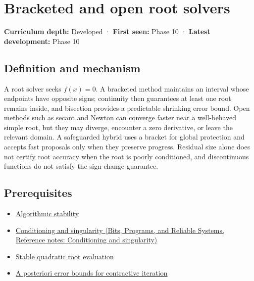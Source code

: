 \hypertarget{appendix-f63eb850796d}{}\label{referencestart:appendix-f63eb850796d}
\section{Bracketed and open root solvers}\label{appendix-f63eb850796d-bracketed-and-open-root-solvers}

\hypertarget{appendix-f63eb850796d-bracketed-and-open-root-solvers}{}

\textbf{Curriculum depth:} Developed · \textbf{First seen:} Phase 10 · \textbf{Latest development:} Phase 10

\begin{allmightroledefinition}

\subsection{Definition and mechanism}\label{appendix-f63eb850796d-definition-and-mechanism}

\hypertarget{appendix-f63eb850796d-definition-and-mechanism}{}

A root solver seeks \(f(x)=0\). A bracketed method maintains an interval whose endpoints have opposite signs; continuity then guarantees at least one root remains inside, and bisection provides a predictable shrinking error bound. Open methods such as secant and Newton can converge faster near a well-behaved simple root, but they may diverge, encounter a zero derivative, or leave the relevant domain. A safeguarded hybrid uses a bracket for global protection and accepts fast proposals only when they preserve progress. Residual size alone does not certify root accuracy when the root is poorly conditioned, and discontinuous functions do not satisfy the sign-change guarantee.

\end{allmightroledefinition}

\subsection{Prerequisites}\label{appendix-f63eb850796d-prerequisites}

\hypertarget{appendix-f63eb850796d-prerequisites}{}

\begin{itemize}
\tightlist
\item
  \hyperref[appendix-aa2bf0d79639]{Algorithmic stability}
\item
  \href{../01-Bits-Programs-and-Reliable-Systems/main.pdf\#nameddest=appendix-8f6a01f284a7}{Conditioning and singularity (Bits, Programs, and Reliable Systems, Reference notes: Conditioning and singularity)}
\item
  \hyperref[appendix-b9afba7f63e5]{Stable quadratic root evaluation}
\item
  \hyperref[appendix-d83b0ad1be7f]{A posteriori error bounds for contractive iteration}
\end{itemize}

